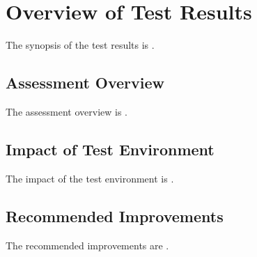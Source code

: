 
\chapter{Overview of Test Results}
\label{loc:OverviewTestResults}


The synopsis of the test results is \TBD.

\section{Assessment Overview}
\label{loc:AssessmentOverview}


The assessment overview is \TBD.


\section{Impact of Test Environment}
\label{loc:ImpactOfTestEnvironment}


The impact of the test environment is \TBD.


\section{Recommended Improvements}
\label{loc:RecommendedImprovements}


The recommended improvements are \TBD.
